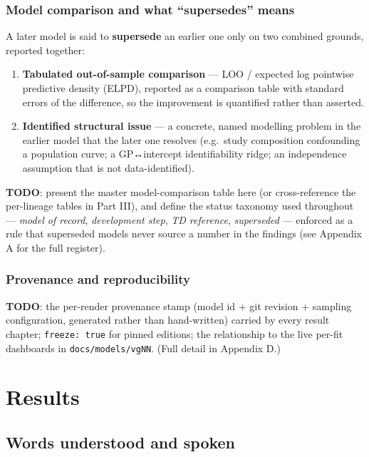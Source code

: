 \documentclass[
  11pt,
  a4paper,
]{report}
\providecommand{\tightlist}{%
  \setlength{\itemsep}{0pt}\setlength{\parskip}{0pt}}
\begin{document}
\section{Model comparison and what ``supersedes''
means}\label{sec-supersedes}

A later model is said to \textbf{supersede} an earlier one only on two
combined grounds, reported together:

\begin{enumerate}
\def\labelenumi{\arabic{enumi}.}
\tightlist
\item
  \textbf{Tabulated out-of-sample comparison} --- LOO / expected log
  pointwise predictive density (ELPD), reported as a comparison table
  with standard errors of the difference, so the improvement is
  quantified rather than asserted.
\item
  \textbf{Identified structural issue} --- a concrete, named modelling
  problem in the earlier model that the later one resolves (e.g.~study
  composition confounding a population curve; a GP↔intercept
  identifiability ridge; an independence assumption that is not
  data-identified).
\end{enumerate}

\textbf{TODO}: present the master model-comparison table here (or
cross-reference the per-lineage tables in Part III), and define the
status taxonomy used throughout --- \emph{model of record},
\emph{development step}, \emph{TD reference}, \emph{superseded} ---
enforced as a rule that superseded models never source a number in the
findings (see Appendix A for the full register).

\section{Provenance and
reproducibility}\label{provenance-and-reproducibility}

\textbf{TODO}: the per-render provenance stamp (model id + git revision
+ sampling configuration, generated rather than hand-written) carried by
every result chapter; \texttt{freeze:\ true} for pinned editions; the
relationship to the live per-fit dashboards in
\texttt{docs/models/vgNN}. (Full detail in Appendix D.)

\part{Results}

\chapter{Words understood and spoken}\label{words-understood-and-spoken}
\end{document}
